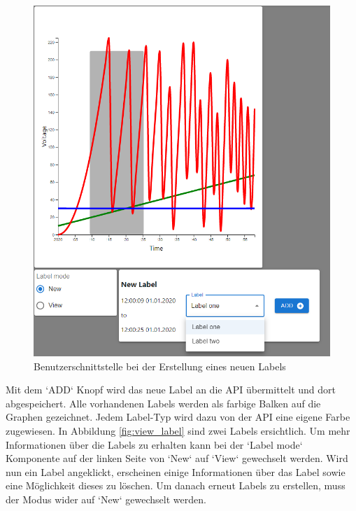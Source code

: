 \begin{figure}[H]
    \centering
    \includegraphics[width=1.0\textwidth]{gfx/newLabel}
    \caption{Benutzerschnittstelle bei der Erstellung eines neuen Labels}
    \label{fig:add_label}
\end{figure}
Mit dem `ADD` Knopf wird das neue Label an die \ac{API} übermittelt und dort abgespeichert.
Alle vorhandenen Labels werden als farbige Balken auf die Graphen gezeichnet.
Jedem Label-Typ wird dazu von der \ac{API} eine eigene Farbe zugewiesen.
In Abbildung \ref{fig:view_label} sind zwei Labels ersichtlich.
Um mehr Informationen über die Labels zu erhalten kann bei der `Label mode` Komponente auf der linken Seite von
`New` auf `View` gewechselt werden.
Wird nun ein Label angeklickt,
erscheinen einige Informationen über das Label sowie eine Möglichkeit dieses zu löschen.
Um danach erneut Labels zu erstellen, muss der Modus wider auf `New` gewechselt werden.



